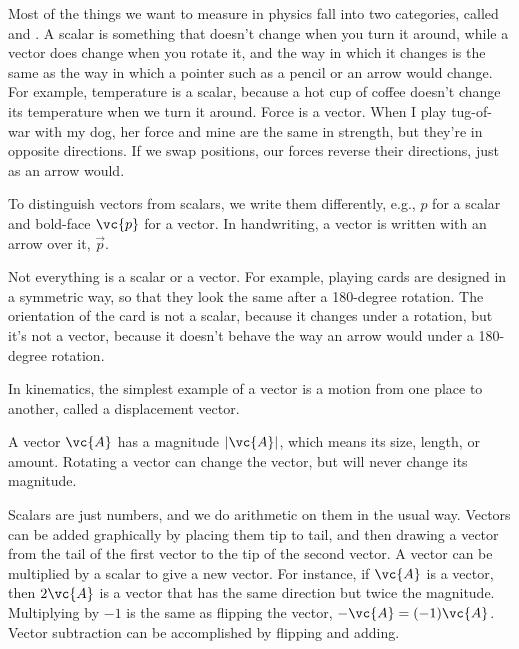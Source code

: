 Most of the things we want to measure in physics fall into two categories,
called  and .
A scalar is something
that doesn't change when you turn it around, while a vector does change
when you rotate it, and the way in which it changes is the same as the way
in which a pointer such as a pencil or an arrow would change. For example,
temperature is a scalar, because a hot cup of coffee doesn't change its temperature
when we turn it around. Force is a vector. When I play tug-of-war with my dog,
her force and mine are the same in strength, but they're in opposite directions.
If we swap positions, our forces reverse their directions, just as an arrow would.


To distinguish vectors from scalars, we write them differently, e.g., $p$ for a scalar
and bold-face $\vc{p}$ for a vector. In handwriting, a vector is written with an arrow
over it, $\overrightarrow{p}$.

Not everything is a scalar or a vector. For example, playing cards are designed
in a symmetric way, so that they look the same after a 180-degree rotation.
The orientation of the card is not a scalar, because it changes under a rotation,
but it's not a vector, because it doesn't behave the way an arrow would under a
180-degree rotation.

In kinematics, the simplest example of a vector is a motion from one place to another,
called a displacement vector.

A vector $\vc{A}$ has a magnitude $|\vc{A}|$, which means its size, length, or amount. Rotating a vector
can change the vector, but will never change its magnitude.

Scalars are just numbers, and we do arithmetic on them in the usual
way.  Vectors can be added graphically by placing them tip to tail,
and then drawing a vector from the tail of the first vector to the tip
of the second vector. A vector can be multiplied by a scalar to give a new
vector. For instance, if $\vc{A}$ is a vector, then $2\vc{A}$ is a vector
that has the same direction but twice the magnitude. Multiplying by $-1$ is
the same as flipping the vector, $-\vc{A}=(-1)\vc{A}$. Vector subtraction can be
accomplished by flipping and adding.


